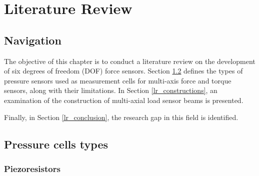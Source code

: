 \chapter{Literature Review}
\label{chapter:literature_review}

\section{Navigation}
\label{lr_navigation}




The objective of this chapter is to conduct a literature review on the development of six degrees of freedom (DOF) force sensors. 
Section \ref{lr_pressure_cell_types} defines the types of pressure sensors used as measurement cells for multi-axis force and torque sensors, 
along with their limitations. 
In Section \ref{lr_constructions}, an examination of the construction of multi-axial load sensor beams is presented. 


Finally, in Section \ref{lr_conclusion}, the research gap in this field is identified.
\section{Pressure cells types}

\label{lr_pressure_cell_types}
\subsection{Piezoresistors}
